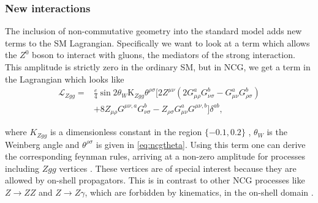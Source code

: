 \subsubsection{New interactions}
The inclusion of non-commutative geometry into the standard model adds new terms to the SM Lagrangian. Specifically we want to look at a term which allows the $Z^0$ boson to interact with gluons, the mediators of the strong interaction. This amplitude is strictly zero in the ordinary SM, but in NCG, we get a term in the Lagrangian which looks like \cite{melic2005smn}
\begin{align} \label{eq:zggterm}
	\mathcal{L}_{Zgg} = &\frac{e}{4}\sin{2\theta_W}\textrm{K}_{Zgg}\theta^{\rho\sigma}
	[2 Z^{\mu\nu} (2 G_{\mu\rho}^a G_{\nu\sigma}^b - G_{\mu\nu}^a G_{\rho\sigma}^b) \nonumber \\
	 &+ 8 Z_{\mu\rho} G^{\mu\nu,a} G_{\nu\sigma}^b - Z_{\rho\sigma} G_{\mu\nu}^a G^{\mu\nu,b}
	] \delta^{ab},
\end{align}

where $K_{Zgg}$ is a dimensionless constant in the region $\{-0.1,0.2\}$ \cite{behr2003dnc}, $\theta_W$ is the Weinberg angle and $\theta^{\rho\sigma}$ is given in \eqref{eq:ncgtheta}. Using this term one can derive the corresponding feynman rules, arriving at a non-zero amplitude for processes including $Zgg$ vertices \cite{melic2005smn}. These vertices are of special interest because they are allowed by on-shell propagators. This is in contrast to other NCG processes like $Z \rightarrow ZZ$ and $Z \rightarrow Z\gamma$, which are forbidden by kinematics, in the on-shell domain \cite{behr2003dnc}.